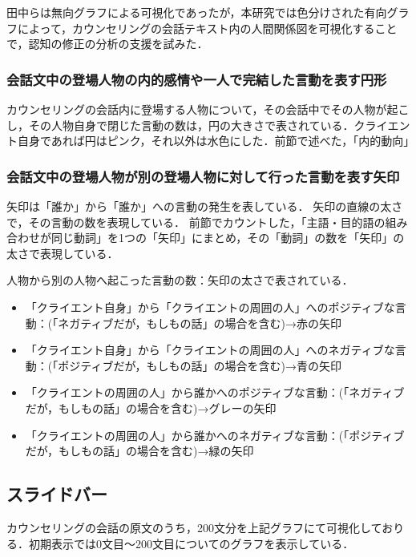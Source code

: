 \documentclass[shuuron]{kuee}
\begin{document}
田中らは無向グラフによる可視化であったが，本研究では色分けされた有向グラフによって，カウンセリングの会話テキスト内の人間関係図を可視化することで，認知の修正の分析の支援を試みた．

\subsubsection{会話文中の登場人物の内的感情や一人で完結した言動を表す円形}

カウンセリングの会話内に登場する人物について，その会話中でその人物が起こし，その人物自身で閉じた言動の数は，円の大きさで表されている．クライエント自身であれば円はピンク，それ以外は水色にした．前節で述べた，「内的動向」


\subsubsection{会話文中の登場人物が別の登場人物に対して行った言動を表す矢印}

矢印は「誰か」から「誰か」への言動の発生を表している．
矢印の直線の太さで，その言動の数を表現している．
前節でカウントした，「主語・目的語の組み合わせが同じ動詞」を1つの「矢印」にまとめ，その「動詞」の数を「矢印」の太さで表現している．

人物から別の人物へ起こった言動の数：矢印の太さで表されている．


\begin{itemize}
  \item 「クライエント自身」から「クライエントの周囲の人」へのポジティブな言動：(「ネガティブだが，もしもの話」の場合を含む)→赤の矢印
  \item 「クライエント自身」から「クライエントの周囲の人」へのネガティブな言動：(「ポジティブだが，もしもの話」の場合を含む)→青の矢印
  \item 「クライエントの周囲の人」から誰かへのポジティブな言動：(「ネガティブだが，もしもの話」の場合を含む)→グレーの矢印
  \item 「クライエントの周囲の人」から誰かへのネガティブな言動：(「ポジティブだが，もしもの話」の場合を含む)→緑の矢印
\end{itemize}



\subsection{スライドバー}

カウンセリングの会話の原文のうち，200文分を上記グラフにて可視化しておりる．初期表示では0文目〜200文目についてのグラフを表示している．
\end{document}
